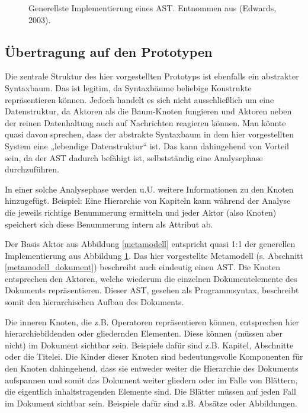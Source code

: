  
\begin{figure}[h!]
\centering
\advance\leftskip-2.5cm
\caption[Generellste Implementierung eines AST]{ Generellste Implementierung eines AST. Entnommen aus (Edwards, 2003). }\label{astimpl}
\end{figure}
 
\subsection{Übertragung auf den Prototypen}\label{}
 
Die zentrale Struktur des hier vorgestellten Prototyps ist ebenfalls ein abstrakter Syntaxbaum. Das ist legitim, da Syntaxbäume beliebige Konstrukte repräsentieren können. Jedoch handelt es sich nicht ausschließlich um eine Datenstruktur, da Aktoren als die Baum-Knoten fungieren und Aktoren neben der reinen Datenhaltung auch auf Nachrichten reagieren können. Man könnte quasi davon sprechen, dass der abstrakte Syntaxbaum in dem hier vorgestellten System eine „lebendige Datenstruktur“ ist. Das kann dahingehend von Vorteil sein, da der AST dadurch befähigt ist, selbstständig eine Analysephase durchzuführen.

 
In einer solche Analysephase werden u.U. weitere Informationen zu den Knoten hinzugefügt. Beispiel: Eine Hierarchie von Kapiteln kann während der Analyse die jeweils richtige Benummerung ermitteln und jeder Aktor (also Knoten) speichert sich diese Benummerung intern als Attribut ab.

 
Der Basis Aktor aus Abbildung \ref{metamodell} entspricht quasi 1:1 der generellen Implementierung aus Abbildung \ref{astimpl}. Das hier vorgestellte Metamodell (s. Abschnitt \ref{metamodell_dokument}) beschreibt auch eindeutig einen AST. Die Knoten entsprechen den Aktoren, welche wiederum die einzelnen Dokumentelemente des Dokuments repräsentieren. Dieser AST, gesehen als Programmsyntax, beschreibt somit den hierarchischen Aufbau des Dokuments.

 
Die inneren Knoten, die z.B. Operatoren repräsentieren können, entsprechen hier hierarchiebildenden oder gliedernden Elementen. Diese können (müssen aber nicht) im Dokument sichtbar sein. Beispiele dafür sind z.B. Kapitel, Abschnitte oder die Titelei. Die Kinder dieser Knoten sind bedeutungsvolle Komponenten für den Knoten dahingehend, dass sie entweder weiter die Hierarchie des Dokuments aufspannen und somit das Dokument weiter gliedern oder im Falle von Blättern, die eigentlich inhaltstragenden Elemente sind. Die Blätter müssen auf jeden Fall im Dokument sichtbar sein. Beispiele dafür sind z.B. Absätze oder Abbildungen.

